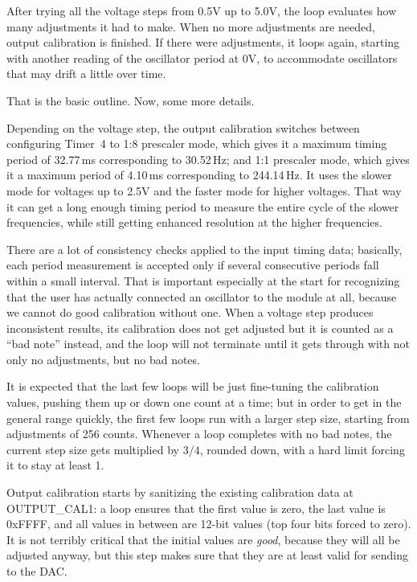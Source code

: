 After trying all the voltage steps from 0.5V up to 5.0V, the loop evaluates
how many adjustments it had to make.  When no more adjustments are needed,
output calibration is finished.  If there were adjustments, it loops again,
starting with another reading of the oscillator period at 0V, to accommodate
oscillators that may drift a little over time.

That is the basic outline.  Now, some more details.

Depending on the voltage step, the output calibration switches between
configuring Timer~4 to 1:8 prescaler mode, which gives it a maximum timing
period of 32.77\,ms corresponding to 30.52\,Hz; and 1:1 prescaler mode,
which gives it a maximum period of 4.10\,ms corresponding to 244.14\,Hz. 
It uses the slower mode for voltages up to 2.5V and the faster mode for
higher voltages.  That way it can get a long enough timing period to measure
the entire cycle of the slower frequencies, while still getting enhanced
resolution at the higher frequencies.

There are a lot of consistency checks applied to the input timing data;
basically, each period measurement is accepted only if several consecutive
periods fall within a small interval.  That is important especially at the
start for recognizing that the user has actually connected an oscillator to
the module at all, because we cannot do good calibration without one. 
When a voltage step produces inconsistent results, its calibration does not
get adjusted but it is counted as a ``bad note'' instead, and the loop will
not terminate until it gets through with not only no adjustments, but no bad
notes.

It is expected that the last few loops will be just fine-tuning the
calibration values, pushing them up or down one count at a time; but in
order to get in the general range quickly, the first few loops run with a
larger step size, starting from adjustments of 256 counts.  Whenever a loop
completes with no bad notes, the current step size gets multiplied by $3/4$,
rounded down, with a hard limit forcing it to stay at least 1.

Output calibration starts by sanitizing the existing calibration data at
OUTPUT\_CAL1:  a loop ensures that the first value is zero, the last value
is 0xFFFF, and all values in between are 12-bit values (top four bits forced
to zero).  It is not terribly critical that the initial values are
\emph{good}, because they will all be adjusted anyway, but this step makes
sure that they are at least valid for sending to the DAC.

